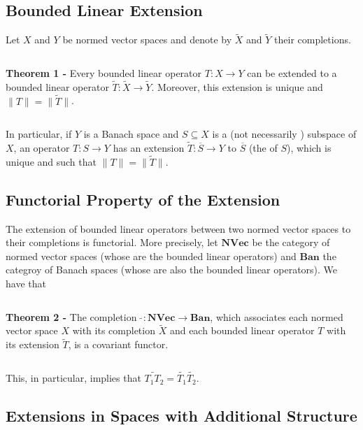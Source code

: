 \documentclass[12pt]{article}
\begin{document}
\subsection{Bounded Linear Extension}

Let $X$ and $Y$ be normed vector spaces and denote by $\widetilde{X}$ and $\widetilde{Y}$ their completions.

$\,$

{\bf Theorem 1 -} Every bounded linear operator $T:X \longrightarrow Y$ can be extended to a bounded linear operator $\widetilde{T} : \widetilde{X} \longrightarrow \widetilde{Y}$. Moreover, this extension is unique and $\|T\| = \|\widetilde{T}\|$.

$\,$

In particular, if $Y$ is a Banach space and $S \subseteq X$ is a (not necessarily ) subspace of $X$, an operator $T:S \longrightarrow Y$ has an extension $\widetilde{T} : \overline{S} \longrightarrow Y$ to $\overline{S}$ (the  of $S$), which is unique and such that $\|T\|= \|\widetilde{T}\|$.

\subsection{Functorial Property of the Extension}

The extension of bounded linear operators between two normed vector spaces to their completions is functorial. More precisely, let $\mathbf{NVec}$ be the category of normed vector spaces (whose  are the bounded linear operators) and $\mathbf{Ban}$ the categroy of Banach spaces (whose  are also the bounded linear operators). We have that

$\,$

{\bf Theorem 2 -} The completion $\,\widetilde{\,} : \mathbf{NVec} \longrightarrow \mathbf{Ban}$, which associates each normed vector space $X$ with its completion $\widetilde{X}$ and each bounded linear operator $T$ with its extension $\widetilde{T}$, is a covariant functor.

$\,$

This, in particular, implies that $\widetilde{T_1T_2} = \widetilde{T_1}\widetilde{T_2}$.

\subsection{Extensions in Spaces with Additional Structure}
\end{document}
